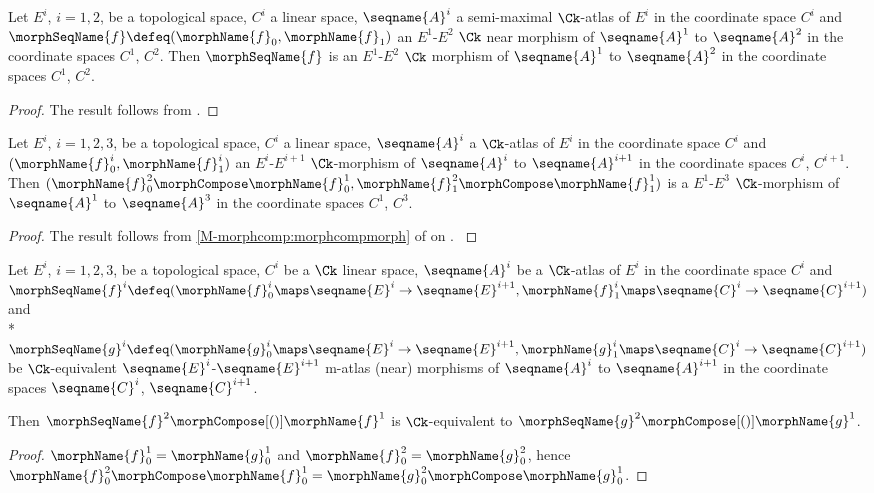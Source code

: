 \documentclass{article}
\begin{document}
\begin{corollary}
\label{cor:Ck-ATLmorph}
Let $E^i$, $i=1,2$, be a topological space, $C^i$ a linear space,
$\seqname{A}^i$ a semi-maximal $\Ck$-atlas of $E^i$ in the coordinate
space $C^i$ and
$\morphSeqName{f} \defeq (\morphName{f}_0, \morphName{f}_1)$ an $E^1$-$E^2$
$\Ck$ near morphism of $\seqname{A}^1$ to $\seqname{A}^2$ in the
coordinate spaces $C^1$, $C^2$. Then $\morphSeqName{f}$ is an $E^1$-$E^2$
$\Ck$ morphism of $\seqname{A}^1$ to $\seqname{A}^2$ in the coordinate
spaces $C^1$, $C^2$.

\begin{proof}
The result follows from .
\end{proof}

Let $E^i$, $i=1,2,3$, be a topological space, $C^i$ a linear space,
$\seqname{A}^i$ a $\Ck$-atlas of $E^i$ in the coordinate space $C^i$ and
$(\morphName{f}^i_0, \morphName{f}^i_1)$ an $E^i$-$E^{i+1}$
$\Ck$-morphism of $\seqname{A}^i$ to $\seqname{A}^{i+1}$ in the
coordinate spaces $C^i$, $C^{i+1}$. Then
$
  (
    \morphName{f}^2_0 \morphCompose \morphName{f}^1_0,
    \morphName{f}^2_1 \morphCompose \morphName{f}^1_1
  )
$
is a $E^1$-$E^3$ $\Ck$-morphism of $\seqname{A}^1$ to $\seqname{A}^3$ in
the coordinate spaces $C^1$, $C^3$.

\begin{proof}
The result follows from
\cref{M-morphcomp:morphcompmorph} of
{
  \showlabelsinline
   on
  .
}
\end{proof}
\end{corollary}

\begin{lemma}
\label{lem:Ck-ATLmorphequiv}
Let $E^i$, $i=1,2,3$, be a topological space,
$C^i$ be a $\Ck$ linear space,
$\seqname{A}^i$ be a $\Ck$-atlas of $E^i$ in the coordinate space $C^i$ and
$
  \morphSeqName{f}^i \defeq
  (
    \morphName{f}^i_0 \maps \seqname{E}^i \to \seqname{E}^{i+1},
    \morphName{f}^i_1 \maps \seqname{C}^i \to \seqname{C}^{i+1}
  )
$
and \\*
$
  \morphSeqName{g}^i \defeq
  (
    \morphName{g}^i_0 \maps \seqname{E}^i \to \seqname{E}^{i+1},
    \morphName{g}^i_1 \maps \seqname{C}^i \to \seqname{C}^{i+1}
  )
$
be $\Ck$-equivalent $\seqname{E}^i$-$\seqname{E}^{i+1}$ m-atlas (near)
morphisms of $\seqname{A}^i$ to $\seqname{A}^{i+1}$ in the coordinate
spaces $\seqname{C}^i$, $\seqname{C}^{i+1}$.

Then $\morphSeqName{f}^2 \morphCompose[()] \morphName{f}^1$ is $\Ck$-equivalent
to $\morphSeqName{g}^2 \morphCompose[()] \morphName{g}^1$.

\begin{proof}
$\morphName{f}^1_0 = \morphName{g}^1_0$ and
$\morphName{f}^2_0 = \morphName{g}^2_0$, hence
$
  \morphName{f}^2_0 \morphCompose \morphName{f}^1_0 =
  \morphName{g}^2_0 \morphCompose \morphName{g}^1_0
$.
\end{proof}
\end{lemma}
\end{document}
